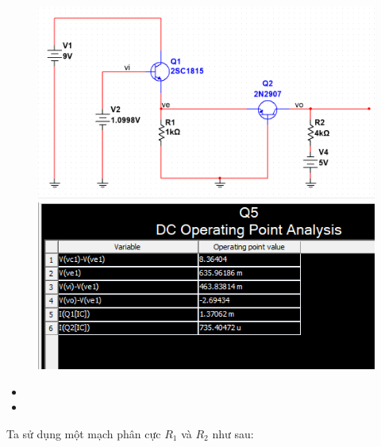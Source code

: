 \begin{figure}[H]
	\centering
	\begin{minipage}{.4\linewidth}
		\includegraphics[width=\linewidth]{./my-chapters/my-images/Question5/b_Q_tong_hinh.png}
	\end{minipage}
	\begin{minipage}{.5\linewidth}
		\includegraphics[width=\linewidth]{./my-chapters/my-images/Question5/b_Q_tong_bang.png}
	\end{minipage}
\end{figure}

\begin{itemize}[label=-, leftmargin=2cm]
	\item {}
	\item {}
\end{itemize}

Ta sử dụng một mạch phân cực $R_{1}$ và $R_{2}$ như sau:

